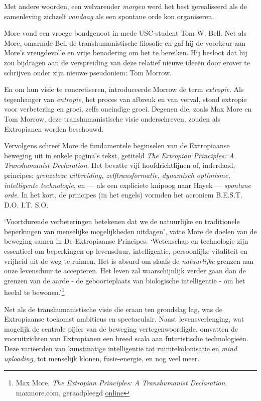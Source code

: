 \documentclass[
  a5paper,
  smalldemyvopaper,11pt,twoside,onecolumn,openright,extrafontsizes,
hidelinks]{memoir}
\begin{document}
Met andere woorden, een welvarender \emph{morgen} werd het best
gerealiseerd als de samenleving zichzelf \emph{vandaag} als een spontane
orde kon organiseren.

More vond een vroege bondgenoot in mede USC-student Tom W. Bell. Net als
More, omarmde Bell de transhumanistische filosofie en gaf hij de
voorkeur aan More's vreugdevolle en vrije benadering om het te bereiken.
Hij besloot dat hij zou bijdragen aan de verspreiding van deze relatief
nieuwe ideeën door erover te schrijven onder zijn nieuwe pseudoniem: Tom
Morrow.

En om hun visie te concretiseren, introduceerde Morrow de term
\emph{extropie}. Als tegenhanger van \emph{entropie}, het proces van
afbreuk en van verval, stond extropie voor verbetering en groei, zelfs
oneindige groei. Degenen die, zoals Max More en Tom Morrow, deze
transhumanistische visie onderschreven, zouden als Extropianen worden
beschouwd.

Vervolgens schreef More de fundamentele beginselen van de Extropiaanse
beweging uit in enkele pagina's tekst, getiteld \emph{The Extropian
Principles: A Transhumanist Declaration}. Het bevatte vijf
hoofdrichtlijnen of, inderdaad, principes: \emph{grenzeloze uitbreiding,
zelftransformatie, dynamisch optimisme, intelligente technologie}, en
--- als een expliciete knipoog naar Hayek --- \emph{spontane orde}. In
het kort, de principes (in het engels) vormden het acroniem B.E.S.T.
D.O. I.T. S.O.

`Voortdurende verbeteringen betekenen dat we de natuurlijke en
traditionele beperkingen van menselijke mogelijkheden uitdagen', vatte
More de doelen van de beweging samen in De Extropiaanse Principes.
`Wetenschap en technologie zijn essentieel om beperkingen op levensduur,
intelligentie, persoonlijke vitaliteit en vrijheid uit de weg te ruimen.
Het is absurd om slaafs de \emph{natuurlijke} grenzen aan onze
levensduur te accepteren. Het leven zal waarschijnlijk verder gaan dan
de grenzen van de aarde - de geboorteplaats van biologische
intelligentie - om het heelal te bewonen.'\footnote{Max More, \emph{The
  Extropian Principles: A Transhumanist Declaration}, maxmore.com,
  geraadpleegd
  \href{https://web.archive.org/web/20090130143449/https://www.maxmore.com/extprn3.htm}{online}}

Net als de transhumanistische visie die eraan ten grondslag lag, was de
Extropiaanse toekomst ambitieus en spectaculair. Naast levensverlenging,
wat mogelijk de centrale pijler van de beweging vertegenwoordigde,
omvatten de vooruitzichten van Extropianen een breed scala aan
futuristische technologieën. Deze variëerden van kunstmatige
intelligentie tot ruimtekolonisatie en \emph{mind uploading}, tot
menselijk klonen, fusie-energie, en nog veel meer.
\end{document}
